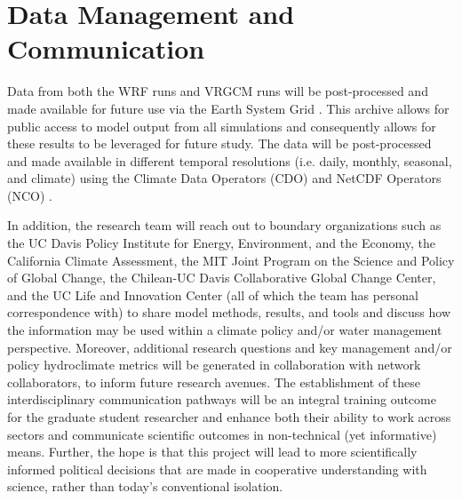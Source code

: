 \documentclass[11pt]{article}
\begin{document}
\setcounter{section}{1}

\section{Data Management and Communication}

Data from both the WRF runs and VRGCM runs will be post-processed and made available for future use via the Earth System Grid \citep{williams2009earth}. This archive allows for public access to model output from all simulations and consequently allows for these results to be leveraged for future study.  The data will be post-processed and made available in different temporal resolutions (i.e. daily, monthly, seasonal, and climate) using the Climate Data Operators (CDO) and NetCDF Operators (NCO) \citep{schulzweida2007cdo,zender2006netcdf}.

In addition, the research team will reach out to boundary organizations such as the UC Davis Policy Institute for Energy, Environment, and the Economy, the California Climate Assessment, the MIT Joint Program on the Science and Policy of Global Change, the Chilean-UC Davis Collaborative Global Change Center, and the UC Life and Innovation Center (all of which the team has personal correspondence with) to share model methods, results, and tools and discuss how the information may be used within a climate policy and/or water management perspective.  Moreover, additional research questions and key management and/or policy hydroclimate metrics will be generated in collaboration with network collaborators, to inform future research avenues.  The establishment of these interdisciplinary communication pathways will be an integral training outcome for the graduate student researcher and enhance both their ability to work across sectors and communicate scientific outcomes in non-technical (yet informative) means.  Further, the hope is that this project will lead to more scientifically informed political decisions that are made in cooperative understanding with science, rather than today's conventional isolation.  

  
\end{document}
